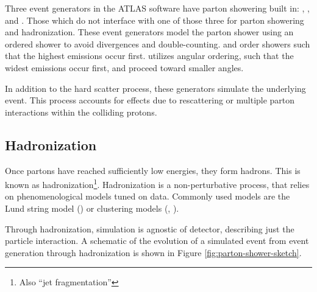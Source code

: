 Three event generators in the ATLAS software have parton showering built in: \PYTHIA, \HERWIG, and \SHERPA. Those which do not interface with one of those three for parton showering and hadronization. These event generators model the parton shower using an ordered shower to avoid divergences and double-counting. \PYTHIA and \SHERPA order showers such that the highest \pt emissions occur first. \HERWIG utilizes angular ordering, such that the widest emissions occur first, and proceed toward smaller angles.

In addition to the hard scatter process, these generators simulate the underlying event. This process accounts for effects due to rescattering or multiple parton interactions within the colliding protons.

\subsection{Hadronization} \label{ssec:hadronization}
Once partons have reached sufficiently low energies, they form hadrons. This is known as hadronization\footnote{Also ``jet fragmentation''}. Hadronization is a non-perturbative process, that relies on phenomenological models tuned on data. Commonly used models are the Lund string model \cite{lund-string} (\PYTHIA) or clustering models \cite{clustering-hadronization} (\HERWIG, \SHERPA).

Through hadronization, simulation is agnostic of detector, describing just the particle interaction. A schematic of the evolution of a simulated event from event generation through hadronization is shown in Figure \ref{fig:parton-shower-sketch}.

